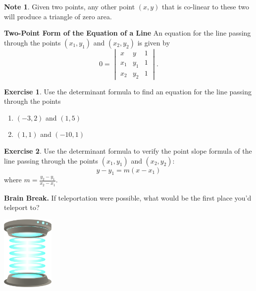 \documentclass{beamer}
\newcommand{\ds}{\displaystyle}
\newcommand{\fn}{\insertframenumber}
\theoremstyle{definition}
\newtheorem{exercise}{Exercise}
\newtheorem*{nb}{Note}
\begin{document}
\begin{frame}{\fn}
	\begin{nb}
		Given two points, any other point $(x,y)$ that is co-linear to these two will produce a triangle of zero area.
	\end{nb}
	\begin{block}{\textbf{Two-Point Form of the Equation of a Line}}
		An equation for the line passing through the points $(x_1,y_1)$ and $(x_2,y_2)$ is given by	
			\[0=\begin{vmatrix}x&y&1\\x_1&y_1&1\\x_2&y_2&1\end{vmatrix}.\]
	\end{block}
	\begin{exercise}
		Use the determinant formula to find an equation for the line passing through the points
			\begin{enumerate}[label=(\alph*)]
				\item $(-3,2)$ and $(1,5)$
				\item $(1,1)$ and $(-10,1)$
			\end{enumerate}
	\end{exercise}
\end{frame}
\begin{frame}{\fn}
	\begin{exercise}
		Use the determinant formula to verify the point slope formula of the line passing through the points $(x_1,y_1)$ and $(x_2,y_2)$:
			\[y-y_1=m(x-x_1)\]
		where $\ds m=\frac{y_2-y_1}{x_2-x_1}$.
	\end{exercise}
\end{frame}

\begin{frame}{\fn}
	\begin{block}{\textbf{Brain Break.}}
		If teleportation were possible, what would be the first place you’d teleport to?
		\begin{center}
			\includegraphics[width=1in]{../images/teleporter}
		\end{center}
	\end{block}
\end{frame}
\end{document}
